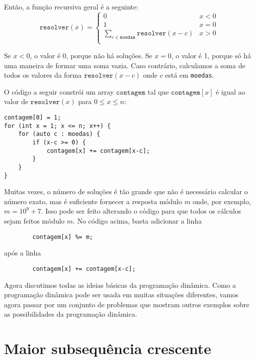 Então, a função recursiva geral é a seguinte:
\begin{equation*}
    \texttt{resolver}(x) = \begin{cases}
               0               & x < 0\\
               1               & x = 0\\
               \sum_{c \in \texttt{moedas}} \texttt{resolver}(x-c) & x > 0 \\
           \end{cases}
\end{equation*}

Se $x<0$, o valor é 0, porque não há soluções.
Se $x=0$, o valor é 1, porque só há uma maneira
de formar uma soma vazia.
Caso contrário, calculamos a soma de todos os valores
da forma $\texttt{resolver}(x-c)$ onde $c$ está em \texttt{moedas}.

O código a seguir constrói um array
$\texttt{contagem}$ tal que
$\texttt{contagem}[x]$ é igual
ao valor de $\texttt{resolver}(x)$
para $0 \le x \le n$:

\begin{lstlisting}
contagem[0] = 1;
for (int x = 1; x <= n; x++) {
    for (auto c : moedas) {
        if (x-c >= 0) {
            contagem[x] += contagem[x-c];
        }
    }
}
\end{lstlisting}

Muitas vezes, o número de soluções é tão grande
que não é necessário calcular o número exato,
mas é suficiente fornecer a resposta módulo $m$
onde, por exemplo, $m=10^9+7$.
Isso pode ser feito alterando o código para que
todos os cálculos sejam feitos módulo $m$.
No código acima, basta adicionar a linha
\begin{lstlisting}
        contagem[x] %= m;
\end{lstlisting}
após a linha
\begin{lstlisting}
        contagem[x] += contagem[x-c];
\end{lstlisting}

Agora discutimos todas as ideias básicas
da programação dinâmica.
Como a programação dinâmica pode ser usada
em muitas situações diferentes,
vamos agora passar por um conjunto de problemas
que mostram outros exemplos sobre as
possibilidades da programação dinâmica.

\section{Maior subsequência crescente}

